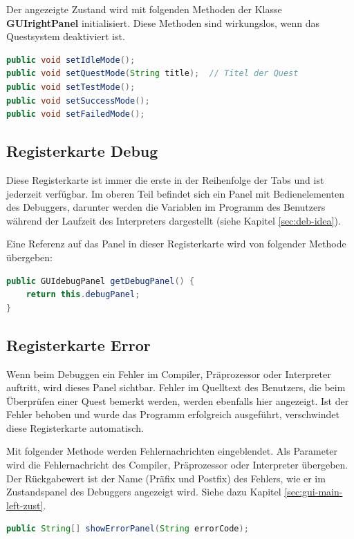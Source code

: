 Der angezeigte Zustand wird mit folgenden Methoden der Klasse \textbf{GUIrightPanel} initialisiert. Diese Methoden sind wirkungslos, wenn das Questsystem deaktiviert ist.
\begin{lstlisting}[language=JAVA]
public void setIdleMode();
public void setQuestMode(String title);  // Titel der Quest
public void setTestMode();
public void setSuccessMode();
public void setFailedMode();
\end{lstlisting}

\subsection{Registerkarte \glqq{}Debug\grqq{}}
\label{sec:gui-main-right-reg-deb}
Diese Registerkarte ist immer die erste in der Reihenfolge der Tabs und ist jederzeit verfügbar. Im oberen Teil befindet sich ein Panel mit Bedienelementen des Debuggers, darunter werden die Variablen im Programm des Benutzers während der Laufzeit des Interpreters dargestellt (siehe Kapitel \ref{sec:deb-idea}).

Eine Referenz auf das Panel in dieser Registerkarte wird von folgender Methode übergeben:
\begin{lstlisting}[language=JAVA]
public GUIdebugPanel getDebugPanel() {
	return this.debugPanel;
}
\end{lstlisting}

\subsection{Registerkarte \glqq{}Error\grqq{}}
\label{sec:gui-main-right-error}
Wenn beim Debuggen ein Fehler im Compiler, Präprozessor oder Interpreter auftritt, wird dieses Panel sichtbar. Fehler im Quelltext des Benutzers, die beim Überprüfen einer Quest bemerkt werden, werden ebenfalls hier angezeigt. Ist der Fehler behoben und wurde das Programm erfolgreich ausgeführt, verschwindet diese Registerkarte automatisch.

Mit folgender Methode werden Fehlernachrichten eingeblendet. Als Parameter wird die Fehlernachricht des Compiler, Präprozessor oder Interpreter übergeben. Der Rückgabewert ist der Name (Präfix und Postfix) des Fehlers, wie er im Zustandspanel des Debuggers angezeigt wird. Siehe dazu Kapitel \ref{sec:gui-main-left-zust}.%
\begin{lstlisting}[language=JAVA]
public String[] showErrorPanel(String errorCode);
\end{lstlisting}

